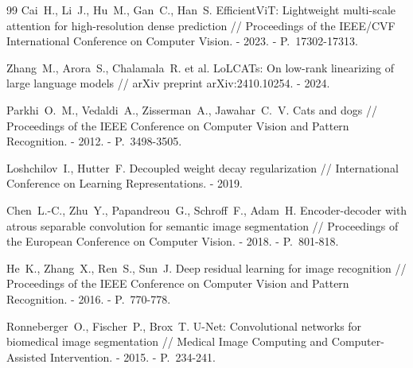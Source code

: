 \documentclass[a4paper,14pt]{article}
\numberwithin{figure}{section}
\numberwithin{table}{section}
\begin{document}
\begin{thebibliography}{99}
 Cai~H., Li~J., Hu~M., Gan~C., Han~S. EfficientViT: Lightweight multi-scale attention for high-resolution dense prediction // Proceedings of the IEEE/CVF International Conference on Computer Vision. - 2023. - P.~17302-17313.

 Zhang~M., Arora~S., Chalamala~R. et al. LoLCATs: On low-rank linearizing of large language models // arXiv preprint arXiv:2410.10254. - 2024.

 Parkhi~O.~M., Vedaldi~A., Zisserman~A., Jawahar~C.~V. Cats and dogs // Proceedings of the IEEE Conference on Computer Vision and Pattern Recognition. - 2012. - P.~3498-3505.

 Loshchilov~I., Hutter~F. Decoupled weight decay regularization // International Conference on Learning Representations. - 2019.

 Chen~L.-C., Zhu~Y., Papandreou~G., Schroff~F., Adam~H. Encoder-decoder with atrous separable convolution for semantic image segmentation // Proceedings of the European Conference on Computer Vision. - 2018. - P.~801-818.

 He~K., Zhang~X., Ren~S., Sun~J. Deep residual learning for image recognition // Proceedings of the IEEE Conference on Computer Vision and Pattern Recognition. - 2016. - P.~770-778.

 Ronneberger~O., Fischer~P., Brox~T. U-Net: Convolutional networks for biomedical image segmentation // Medical Image Computing and Computer-Assisted Intervention. - 2015. - P.~234-241.

\end{thebibliography}
\end{document}
